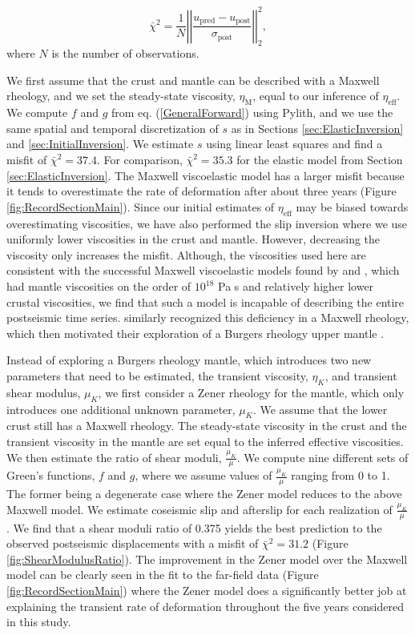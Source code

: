 \documentclass[draft,linenumbers]{AGUJournal}
\begin{document}
\begin{equation}\label{eq:Misfit}
  \bar\chi^2 = \frac{1}{N}\left|\left|\frac{u_\mathrm{pred} - u_\mathrm{post}}{\sigma_\mathrm{post}}\right|\right|_2^2,
\end{equation}
where $N$ is the number of observations.

We first assume that the crust and mantle can be described with a Maxwell rheology, and we set the steady-state viscosity, $\eta_\mathrm{M}$, equal to our inference of $\eta_{\mathrm{eff}}$.  We compute $f$ and $g$ from eq. (\ref{GeneralForward}) using Pylith, and we use the same spatial and temporal discretization of $s$ as in Sections \ref{sec:ElasticInversion} and \ref{sec:InitialInversion}. We estimate $s$ using linear least squares and find a misfit of $\bar\chi^2=37.4$. For comparison, $\bar\chi^2=35.3$ for the elastic model from Section \ref{sec:ElasticInversion}.  The Maxwell viscoelastic model has a larger misfit because it tends to overestimate the rate of deformation after about three years (Figure \ref{fig:RecordSectionMain}). Since our initial estimates of $\eta_\mathrm{eff}$ may be biased towards overestimating viscosities, we have also performed the slip inversion where we use uniformly lower viscosities in the crust and mantle. However, decreasing the viscosity only increases the misfit.  Although, the viscosities used here are consistent with the successful Maxwell viscoelastic models found by \citet{Rollins2015} and \citet{Spinler2015}, which had mantle viscosities on the order of $10^{18}$ Pa s and relatively higher lower crustal viscosities, we find that such a model is incapable of describing the entire postseismic time series.  \citet{Pollitz2001} similarly recognized this deficiency in a Maxwell rheology, which then motivated their exploration of a Burgers rheology upper mantle \citep{Pollitz2003}.  

Instead of exploring a Burgers rheology mantle, which introduces two new parameters that need to be estimated, the transient viscosity, $\eta_{K}$, and transient shear modulus, $\mu_{K}$, we first consider a Zener rheology for the mantle, which only introduces one additional unknown parameter, $\mu_{K}$.  We assume that the lower crust still has a Maxwell rheology. The steady-state viscosity in the crust and the transient viscosity in the mantle are set equal to the inferred effective viscosities.  We then estimate the ratio of shear moduli, $\frac{\mu_K}{\mu}$. We compute nine different sets of Green's functions, $f$ and $g$, where we assume values of $\frac{\mu_K}{\mu}$ ranging from 0 to 1. The former being a degenerate case where the Zener model reduces to the above Maxwell model.  We estimate coseismic slip and afterslip for each realization of $\frac{\mu_K}{\mu}$.  We find that a shear moduli ratio of 0.375 yields the best prediction to the observed postseismic displacements with a misfit of $\bar\chi^2=31.2$ (Figure \ref{fig:ShearModulusRatio}).  The improvement in the Zener model over the Maxwell model can be clearly seen in the fit to the far-field data (Figure \ref{fig:RecordSectionMain}) where the Zener model does a significantly better job at explaining the transient rate of deformation throughout the five years considered in this study.  
\end{document}
